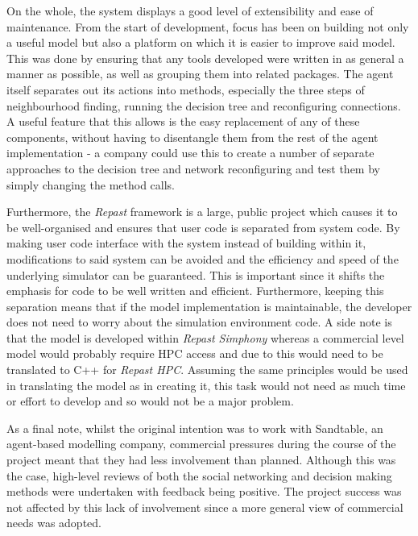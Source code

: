 \documentclass[]{report}
\begin{document}
On the whole, the system displays a good level of extensibility and ease of maintenance. From the start of development, focus has been on building not only a useful model but also a platform on which it is easier to improve said model. This was done by ensuring that any tools developed were written in as general a manner as possible, as well as grouping them into related packages. The agent itself separates out its actions into methods, especially the three steps of neighbourhood finding, running the decision tree and reconfiguring connections. A useful feature that this allows is the easy replacement of any of these components, without having to disentangle them from the rest of the agent implementation - a company could use this to create a number of separate approaches to the decision tree and network reconfiguring and test them by simply changing the method calls.

Furthermore, the \emph{Repast} framework is a large, public project which causes it to be well-organised and ensures that user code is separated from system code. By making user code interface with the system instead of building within it, modifications to said system can be avoided and the efficiency and speed of the underlying simulator can be guaranteed. This is important since it shifts the emphasis for code to be well written and efficient. Furthermore, keeping this separation means that if the model implementation is maintainable, the developer does not need to worry about the simulation environment code. A side note is that the model is developed within \emph{Repast Simphony} whereas a commercial level model would probably require HPC access and due to this would need to be translated to C++ for \emph{Repast HPC}. Assuming the same principles would be used in translating the model as in creating it, this task would not need as much time or effort to develop and so would not be a major problem.

As a final note, whilst the original intention was to work with Sandtable, an agent-based modelling company, commercial pressures during the course of the project meant that they had less involvement than planned. Although this was the case, high-level reviews of both the social networking and decision making methods were undertaken with feedback being positive. The project success was not affected by this lack of involvement since a more general view of commercial needs was adopted.
\end{document}
